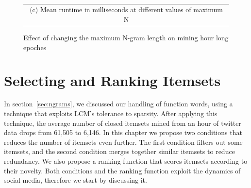 \documentclass[letterpaper,12pt,titlepage,oneside,final]{book}
\begin{document}
\begin{figure}
{}
\\
\begin{tabular}{c}
\\(c) Mean runtime in milliseconds at different values of maximum N
\end{tabular}
\caption{Effect of changing the maximum N-gram length on mining hour long epoches}
\label{fig:ngramsLen}
\end{figure} 






\chapter{Selecting and Ranking Itemsets} %
\label{sec:strong}

In section~\ref{sec:ngrams}, we discussed our handling of function words,
using a technique that exploits LCM's tolerance to sparsity.
After applying this technique, the average number of closed itemsets 
mined from an
hour of twitter data drops from 61,505 to 6,146.
In this chapter we propose two conditions
that reduces the number of itemsets even further.
The first condition filters out some itemsets,
and the second condition merges together
similar itemsets to reduce redundancy.
We also propose a ranking function that
scores itemsets according to their novelty.
Both conditions and the ranking function 
exploit the dynamics of social media,
therefore we start by discussing it.
\end{document}
